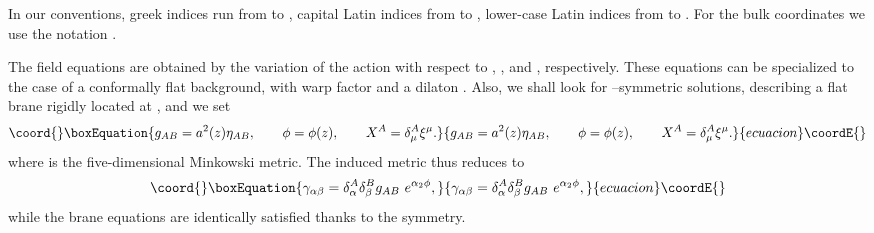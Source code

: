 \documentclass[a4paper,12pt]{article}
\begin{document}
In our conventions, greek indices run from \coordHE{} to \coordHE{}, capital
Latin indices from \coordHE{} to \coordHE{}, lower-case Latin indices from \coordHE{}
to \coordHE{}. For the bulk coordinates we use the notation \coordHE{}.

The field equations are obtained by the variation of the action
with respect to \coordHE{}, \myHighlight{$\phi$}\coordHE{}, \coordHE{} and
\myHighlight{$\gamma_{\alpha\beta}$}\coordHE{}, respectively. These equations can be
specialized to the case of a conformally flat background, with
warp factor \coordHE{} and a dilaton \coordHE{}. Also, we shall look
for \coordHE{}--symmetric solutions, describing a flat brane
rigidly located at \coordHE{}, and we set
\begin{equation}\coord{}\boxEquation{
g_{AB}= a^2(z)\eta_{AB}, ~~~~~~ \phi = \phi(z), ~~~~~~ X^A =
\delta^A_\mu\xi^\mu. \label{26}
}{
g_{AB}= a^2(z)\eta_{AB}, ~~~~~~ \phi = \phi(z), ~~~~~~ X^A =
\delta^A_\mu\xi^\mu. }{ecuacion}\coordE{}\end{equation}
where \coordHE{} is the five-dimensional Minkowski metric. The
induced metric thus reduces to
\begin{equation}\coord{}\boxEquation{
\gamma_{\alpha \beta} = \delta^A_\alpha \delta^B_\beta g_{AB}~
e^{\alpha_2 \phi},
}{
\gamma_{\alpha \beta} = \delta^A_\alpha \delta^B_\beta g_{AB}~
e^{\alpha_2 \phi},
}{ecuacion}\coordE{}\end{equation}
while the brane equations are identically satisfied thanks to the
\coordHE{} symmetry.
\end{document}
